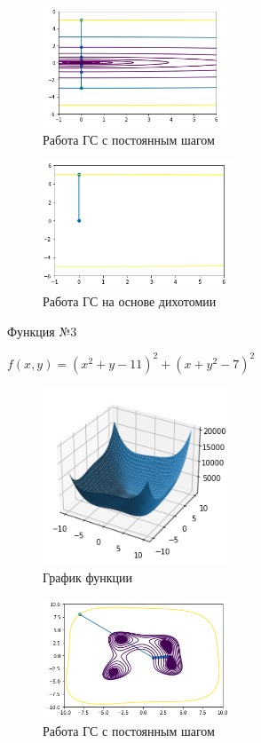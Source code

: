 \begin{figure}[ht]
    \centering
    \includegraphics[width=0.5\textwidth]{images/g11.png}
    \caption{Работа ГС с постоянным шагом}
    \label{fig:g11}
\end{figure}

\begin{figure}[ht]
    \centering
    \includegraphics[width=0.5\textwidth]{images/g12.png}
    \caption{Работа ГС на основе дихотомии}
    \label{fig:g12}
\end{figure}

\newpage

Функция №3

$f(x,y) = (x^2 + y - 11)^2 + (x + y^2 - 7)^2$

\begin{figure}[ht]
    \centering
    \includegraphics[width=0.5\textwidth]{images/g30.png}
    \caption{График функции}
    \label{fig:g30}
\end{figure}

\begin{figure}[ht]
    \centering
    \includegraphics[width=0.5\textwidth]{images/g31.png}
    \caption{Работа ГС с постоянным шагом}
    \label{fig:g31}
\end{figure}

